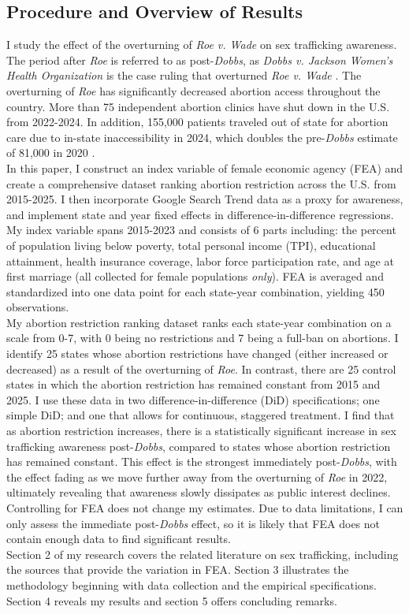 \subsection{Procedure and Overview of Results}
\indent I study the effect of the overturning of \textit{Roe v. Wade} on sex trafficking awareness. The period after \textit{Roe} is referred to as post-\textit{Dobbs}, as \textit{Dobbs v. Jackson Women’s Health Organization} \citep{dobbs2022} is the case ruling that overturned \textit{Roe v. Wade} \citep{roe_v_wade}. The overturning of \textit{Roe} has significantly decreased abortion access throughout the country. More than 75 independent abortion clinics have shut down in the U.S. from 2022-2024. In addition, 155,000 patients traveled out of state for abortion care due to in-state inaccessibility in 2024, which doubles the pre-\textit{Dobbs} estimate of 81,000 in 2020 \citep{kff2026abortion}. \\
\indent In this paper, I construct an index variable of female economic agency (FEA) and create a comprehensive dataset ranking abortion restriction across the U.S. from 2015-2025. I then incorporate Google Search Trend data as a proxy for awareness, and implement state and year fixed effects in difference-in-difference regressions. My index variable spans 2015-2023 and consists of 6 parts including: the percent of population living below poverty, total personal income (TPI), educational attainment, health insurance coverage, labor force participation rate, and age at first marriage (all collected for female populations \textit{only}). FEA is averaged and standardized into one data point for each state-year combination, yielding 450 observations. \\
\indent My abortion restriction ranking dataset ranks each state-year combination on a scale from 0-7, with 0 being no restrictions and 7 being a full-ban on abortions. I identify 25 states whose abortion restrictions have changed (either increased or decreased) as a result of the overturning of \textit{Roe}. In contrast, there are 25 control states in which the abortion restriction has remained constant from 2015 and 2025. I use these data in two difference-in-difference (DiD) specifications; one simple DiD; and one that allows for continuous, staggered treatment. I find that as abortion restriction increases, there is a statistically significant increase in sex trafficking awareness post-\textit{Dobbs}, compared to states whose abortion restriction has remained constant. This effect is the strongest immediately post-\textit{Dobbs}, with the effect fading as we move further away from the overturning of \textit{Roe} in 2022, ultimately revealing that awareness slowly dissipates as public interest declines. Controlling for FEA does not change my estimates. Due to data limitations, I can only assess the immediate post-\textit{Dobbs} effect, so it is likely that FEA does not contain enough data to find significant results. \\
\indent Section 2 of my research covers the related literature on sex trafficking, including the sources that provide the variation in FEA. Section 3 illustrates the methodology beginning with data collection and the empirical specifications. Section 4 reveals my results and section 5 offers concluding remarks. 

